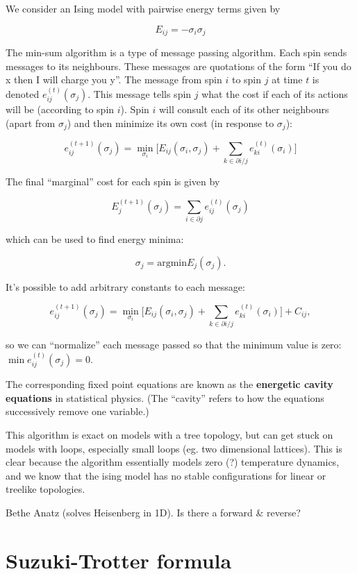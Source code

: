 \documentclass[11pt]{article}
\begin{document}

We consider an Ising model with pairwise energy terms given by

$$
    E_{ij} = -\sigma_i\sigma_j
$$

The min-sum algorithm is a type of message passing algorithm.
Each spin sends messages to its neighbours.
These messages are quotations of the form 
``If you do x then I will charge you y''.
The message from spin $i$ to spin $j$ at time $t$ is denoted
$e_{ij}^{(t)}(\sigma_j)$.
This message tells spin $j$ what the cost if each of
its actions will be (according to spin $i$).
Spin $i$ will consult each of its other neighbours 
(apart from $\sigma_j$) and then minimize its own cost
(in response to $\sigma_j$):

$$
e_{ij}^{(t+1)}(\sigma_j) = \min_{\sigma_i}\bigl[ E_{ij}(\sigma_i, \sigma_j)
  + \sum_{k\in \partial i/j} e_{ki}^{(t)}(\sigma_i) \bigr]
$$

The final ``marginal'' cost for each spin is given by

$$
    E_j^{(t+1)}(\sigma_j) = \sum_{i\in \partial j} e_{ij}^{(t)}(\sigma_j)
$$

which can be used to find energy minima:

$$
    \sigma_j = \text{argmin} E_j(\sigma_j).
$$

It's possible to add arbitrary constants to each
message:

$$
e_{ij}^{(t+1)}(\sigma_j) = \min_{\sigma_i}\bigl[ E_{ij}(\sigma_i, \sigma_j)
  + \sum_{k\in \partial i/j} e_{ki}^{(t)}(\sigma_i) \bigr] + C_{ij},
$$

so we can ``normalize'' each message passed so
that the minimum value is zero: $\min e_{ij}^{(t)}(\sigma_j) = 0.$

The corresponding fixed point equations are known
as the {\bf energetic cavity equations} in statistical physics.
(The ``cavity'' refers to how the equations successively
remove one variable.)

This algorithm is exact on models with a tree topology,
but can get stuck on models with loops, especially small
loops (eg. two dimensional lattices). This is clear
because the algorithm essentially models zero (?) temperature
dynamics, and we know that the ising model has no
stable configurations for linear or treelike topologies.


Bethe Anatz (solves Heisenberg in 1D). 
Is there a forward \& reverse?

\section{Suzuki-Trotter formula}
\end{document}
